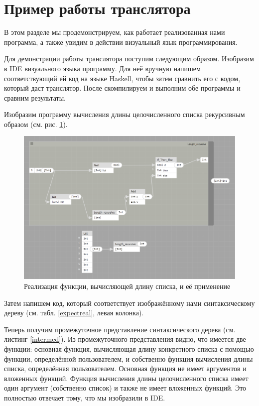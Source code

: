 \section{Пример работы транслятора}\label{transexample}
В этом разделе мы продемонстрируем, как работает реализованная нами программа, а также увидим в действии визуальный язык программирования.

Для демонстрации работы транслятора поступим следующим образом. Изобразим в IDE визуального языка программу. Для неё вручную напишем соответствующий ей код на языке Haskell, чтобы затем сравнить его с кодом, который даст транслятор. После скомпилируем и выполним обе программы и сравним результаты.

Изобразим программу вычисления длины целочисленного списка рекурсивным образом (см. рис. \ref{lengthrec}). 
\begin{figure}[p]
	\centering
	\includegraphics[width=\textwidth]{img/length.PNG}
	\caption{Реализация функции, вычисляющей длину списка, и её применение} \label{lengthrec}	
\end{figure}
Затем напишем код, который соответствует изображённому нами синтаксическому дереву (см. табл. \ref{expectreal}, левая колонка). 

Теперь получим промежуточное представление синтаксического дерева (см. листинг \ref{intermed}). Из промежуточного представления видно, что имеется две функции: основная функция, вычисляющая длину конкретного списка с помощью функции, определённой пользователем, и собственно функция вычисления длины списка, определённая пользователем. Основная функция не имеет аргументов и вложенных функций. Функция вычисления длины целочисленного списка имеет один аргумент (собственно список) и также не имеет вложенных функций. Это полностью отвечает тому, что мы изобразили в IDE.

